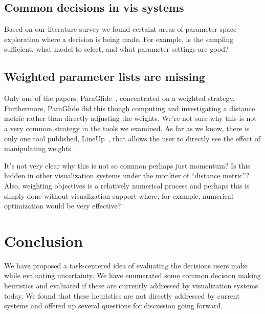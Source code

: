\subsection{Common decisions in vis systems}
\label{common-decisions-in-vis-systems}

Based on our literature survey we found certaint areas of parameter space
exploration where a decision is being made.  For example, is the sampling
sufficient, what model to select, and what parameter settings are good?

\subsection{Weighted parameter lists are
missing}\label{weighted-parameter-lists-are-missing}

Only one of the papers, ParaGlide~\citep{Bergner:2013}, concentrated on a
weighted strategy. Furthermore, ParaGlide did this though computing and
investigating a distance metric rather than directly adjusting the
weights. We're not sure why this is not a very common strategy in the
tools we examined. As far as we know, there is only one tool published,
LineUp~\citep{Gratzl:2013}, that allows the user to directly see the
effect of manipulating weights.

It's not very clear why this is not so common perhaps just momentum? Is
this hidden in other visualization systems under the monkier of
``distance metric''? Also, weighting objectives is a relatively
numerical process and perhaps this is simply done without visualization
support where, for example, numerical optimization would be very
effective?

\section{Conclusion}

We have proposed a task-centered idea of evaluating the decisions users
make while evaluating uncertainty. We have enumerated some common decision
making heuristics and evaluated if these are currently addressed by 
visualization systems today. We found that these heuristics are not directly
addressed by current systems and offered up several questions for
discussion going forward.

